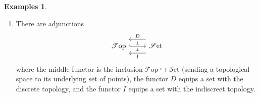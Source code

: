 \documentclass[10pt,oneside]{book}
\def\~#1{\mathscr{#1}}
\newcommand{\mono}{\hookrightarrow}
\newcommand{\Set}{\~S\mathrm{et}}
\newcommand{\Top}{\~T\mathrm{op}}
\theoremstyle{plain}
\theoremstyle{definition}
\newtheorem{exs}[thm]{Examples}
\theoremstyle{remark}
\numberwithin{equation}{section}
\numberwithin{figure}{section}
\begin{document}
\begin{exs}
\begin{enumerate}[label=(\roman*)]
        An \emph{algebra} or \emph{model} for an algebraic theory consists of a set $X$ together with a specified map $X^n \to X$ for each operation of arity $n$, such that the desired equations hold everywhere. For instance, a model for the algebraic theory of groups is exactly a group. 
        The main property of an algebraic theory is that the equations hold \emph{everywhere}. This is why the theory of fields is not an algebraic theory: the inversion map $x \mapsto x^{-1}$ is not defined for \emph{all} $x$, only $x \ne 0$.

        \item There are adjunctions
        \[\begin{tikzcd}
            \Top & \Set
            \arrow[""{name=0, anchor=center, inner sep=0}, hook, from=1-1, to=1-2]
            \arrow[""{name=1, anchor=center, inner sep=0}, "I", shift left=4, from=1-2, to=1-1]
            \arrow[""{name=2, anchor=center, inner sep=0}, "D"', shift right=4, from=1-2, to=1-1]
            \arrow["\dashv"{anchor=center, rotate=-90}, draw=none, from=0, to=1]
            \arrow["\dashv"{anchor=center, rotate=-90}, draw=none, from=2, to=0]
        \end{tikzcd}\]
        where the middle functor is the inclusion $\Top \mono \Set$ (sending a topological space to its underlying set of points), the functor $D$ equips a set with the discrete topology, and the functor $I$ equips a set with the indiscreet topology.


\end{enumerate}
\end{exs}
\end{document}
